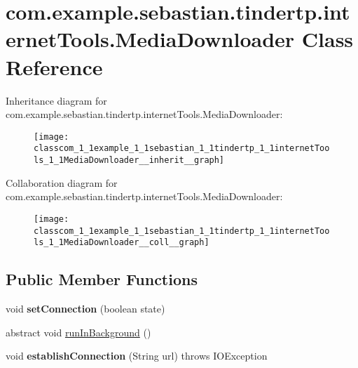 \hypertarget{classcom_1_1example_1_1sebastian_1_1tindertp_1_1internetTools_1_1MediaDownloader}{}\section{com.\+example.\+sebastian.\+tindertp.\+internet\+Tools.\+Media\+Downloader Class Reference}
\label{classcom_1_1example_1_1sebastian_1_1tindertp_1_1internetTools_1_1MediaDownloader}


Inheritance diagram for com.\+example.\+sebastian.\+tindertp.\+internet\+Tools.\+Media\+Downloader\+:\nopagebreak
\begin{figure}[H]
\begin{center}
\leavevmode
\texttt{[image: classcom\_1\_1example\_1\_1sebastian\_1\_1tindertp\_1\_1internetTools\_1\_1MediaDownloader\_\_inherit\_\_graph]}
\end{center}
\end{figure}


Collaboration diagram for com.\+example.\+sebastian.\+tindertp.\+internet\+Tools.\+Media\+Downloader\+:\nopagebreak
\begin{figure}[H]
\begin{center}
\leavevmode
\texttt{[image: classcom\_1\_1example\_1\_1sebastian\_1\_1tindertp\_1\_1internetTools\_1\_1MediaDownloader\_\_coll\_\_graph]}
\end{center}
\end{figure}
\subsection*{Public Member Functions}
\begin{DoxyCompactItemize}
\item 
void {\bfseries set\+Connection} (boolean state)\hypertarget{classcom_1_1example_1_1sebastian_1_1tindertp_1_1internetTools_1_1MediaDownloader_a4c16ac9d418ed10daffb07e9ad322e0b}{}\label{classcom_1_1example_1_1sebastian_1_1tindertp_1_1internetTools_1_1MediaDownloader_a4c16ac9d418ed10daffb07e9ad322e0b}

\item 
abstract void \hyperlink{classcom_1_1example_1_1sebastian_1_1tindertp_1_1internetTools_1_1MediaDownloader_a66586cd5537ffb72797cbddd827a52b6}{run\+In\+Background} ()
\item 
void {\bfseries establish\+Connection} (String url)  throws I\+O\+Exception \hypertarget{classcom_1_1example_1_1sebastian_1_1tindertp_1_1internetTools_1_1MediaDownloader_ad4c3129f9cac2cf8db54c705787a9f9f}{}\label{classcom_1_1example_1_1sebastian_1_1tindertp_1_1internetTools_1_1MediaDownloader_ad4c3129f9cac2cf8db54c705787a9f9f}

\end{DoxyCompactItemize}
